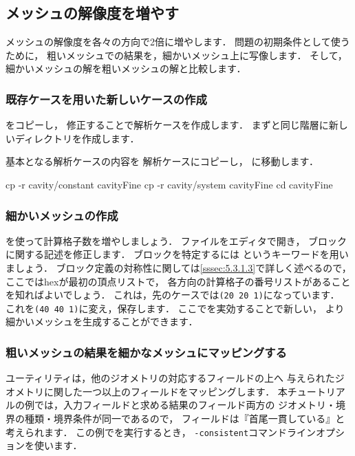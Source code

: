 \subsection{メッシュの解像度を増やす}
\label{ssec:2.1.5}
%
メッシュの解像度を各々の方向で2倍に増やします．
問題の初期条件として使うために，
粗いメッシュでの結果を，細かいメッシュ上に写像します．
そして，細かいメッシュの解を粗いメッシュの解と比較します．

\subsubsection{既存ケースを用いた新しいケースの作成}
\label{sssec:2.1.5.1}
をコピーし，
修正することで解析ケースを作成します．
まずと同じ階層に新しいディレクトリを作成します．
基本となる解析ケースの内容を
解析ケースにコピーし，
に移動します．
\begin{OFverbatim}[terminal]
cp -r cavity/constant cavityFine
cp -r cavity/system cavityFine
cd cavityFine
\end{OFverbatim}

\subsubsection{細かいメッシュの作成}
\label{sssec:2.1.5.2}
を使って計算格子数を増やしましょう．
ファイルをエディタで開き，
ブロックに関する記述を修正します．
ブロックを特定するには
%
%
というキーワードを用いましょう．
ブロック定義の対称性に関しては\autoref{sssec:5.3.1.3}で詳しく述べるので，
ここではhexが最初の頂点リストで，
各方向の計算格子の番号リストがあることを知ればよいでしょう．
これは，先のケースでは\texttt{(20 20 1)}になっています．
これを\texttt{(40 40 1)}に変え，保存します．
ここでを実効することで新しい，
より細かいメッシュを生成することができます．

\subsubsection{粗いメッシュの結果を細かなメッシュにマッピングする}
\label{sssec:2.1.5.3}
%
%
ユーティリティは，他のジオメトリの対応するフィールドの上へ
与えられたジオメトリに関した一つ以上のフィールドをマッピングします．
本チュートリアルの例では，入力フィールドと求める結果のフィールド両方の
ジオメトリ・境界の種類・境界条件が同一であるので，
フィールドは『首尾一貫している』と考えられます．
この例でを実行するとき，
\texttt{-consistent}コマンドラインオプションを使います．

